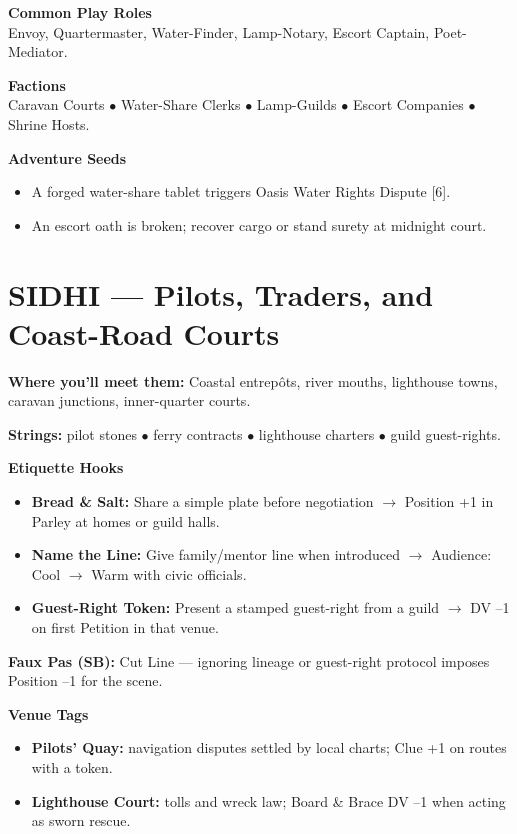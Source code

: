 \documentclass[11pt]{article}
\begin{document}
\textbf{Common Play Roles}\\
Envoy, Quartermaster, Water-Finder, Lamp-Notary, Escort Captain, Poet-Mediator.

\textbf{Factions}\\
Caravan Courts $\bullet$ Water-Share Clerks $\bullet$ Lamp-Guilds $\bullet$ Escort Companies $\bullet$ Shrine Hosts.

\textbf{Adventure Seeds}
\begin{itemize}
\item A forged water-share tablet triggers Oasis Water Rights Dispute [6].
\item An escort oath is broken; recover cargo or stand surety at midnight court.
\end{itemize}

\section*{SIDHI --- Pilots, Traders, and Coast-Road Courts}

\textbf{Where you'll meet them:} Coastal entrepôts, river mouths, lighthouse towns, caravan junctions, inner-quarter courts.

\textbf{Strings:} pilot stones $\bullet$ ferry contracts $\bullet$ lighthouse charters $\bullet$ guild guest-rights.

\textbf{Etiquette Hooks}
\begin{itemize}
\item \textbf{Bread \& Salt:} Share a simple plate before negotiation $\rightarrow$ Position +1 in Parley at homes or guild halls.
\item \textbf{Name the Line:} Give family/mentor line when introduced $\rightarrow$ Audience: Cool $\rightarrow$ Warm with civic officials.
\item \textbf{Guest-Right Token:} Present a stamped guest-right from a guild $\rightarrow$ DV --1 on first Petition in that venue.
\end{itemize}

\textbf{Faux Pas (SB):} Cut Line --- ignoring lineage or guest-right protocol imposes Position --1 for the scene.

\textbf{Venue Tags}
\begin{itemize}
\item \textbf{Pilots' Quay:} navigation disputes settled by local charts; Clue +1 on routes with a token.
\item \textbf{Lighthouse Court:} tolls and wreck law; Board \& Brace DV --1 when acting as sworn rescue.
\end{itemize}
\end{document}
